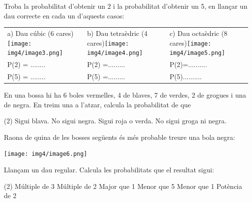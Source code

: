 \pagebreak
 \begin{mylist}

\exer \spen  Troba la probabilitat d'obtenir un 2 i la probabilitat d'obtenir un 5, en llançar un dau correcte en cada un d'aquests casos:

\begin{longtable}{p{1.5in}p{1.2in}p{1.2in}} 
	\centering 
a) Dau cúbic (6 cares)\newline \texttt{[image: img4/image3.png]} & b) Dau tetraèdric (4 cares)\newline \texttt{[image: img4/image4.png]} & c) Dau octaèdric (8 cares)\newline \texttt{[image: img4/image5.png]} \\ [0.5cm] \quad P(2) = ........ & \quad P(2) =......... & \quad P(2)=.......... \\  [0.2cm] \quad P(5) = ........ & \quad P(5) =......... & \quad P(5).......... \\
\end{longtable}

\answers{[$P(2)=\frac{1}{6}$; $P(5)=\frac{1}{6}$,  $P(2)=\frac{1}{4}$; $P(5)=0$,  $P(2)=\frac{1}{8}$; $P(5)=\frac{1}{8}$]}


  \exer \spen En una bossa hi ha 6 boles vermelles, 4 de blaves, 7 de verdes, 2 de grogues i una de negra. En treim una a l'atzar, calcula la probabilitat de que
\begin{tasks}(2)
	\task  Sigui blava.    
	\task  No sigui negra.
	\task  Sigui roja o verda.   
	\task  No sigui groga ni negra.
\end{tasks}
 

\exer  Raona de quina de les bosses següents és més probable treure una bola negra:
\begin{center}
 \texttt{[image: img4/image6.png]}
\end{center}

\exer \spen Llançam un dau regular. Calcula les probabilitats que el resultat sigui:
\begin{tasks}(2)
	\task    Múltiple de  3   
	\task  Múltiple de 2
	\task    Major que 1    
	\task  Menor que 5
	\task    Menor que 1   
	\task   Potència de 2
\end{tasks}


\end{mylist}
